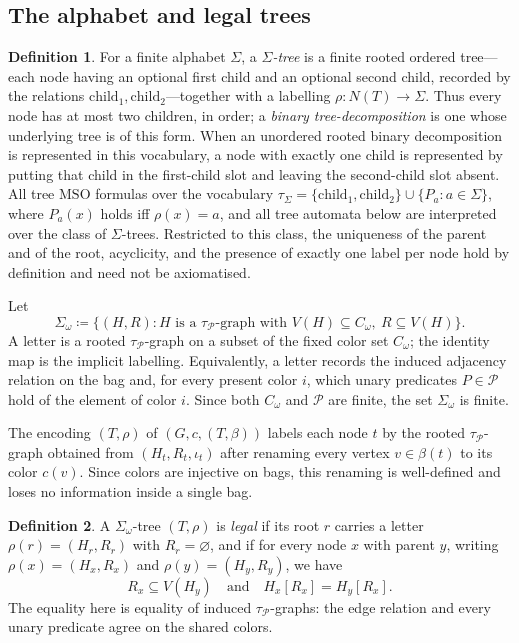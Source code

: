 \documentclass[11pt]{article}
\theoremstyle{definition}
\newtheorem{definition}{Definition}[section]
\newcommand{\MSO}{\ensuremath{\mathrm{MSO}}}
\newcommand{\defeq}{\coloneqq}
\newcommand{\child}{\mathrm{child}}
\newcommand{\Pred}{\mathcal P}
\begin{document}
\subsection{The alphabet and legal trees}

\begin{definition}\label{def:sigma-tree}
For a finite alphabet \(\Sigma\), a \emph{\(\Sigma\)-tree} is a finite rooted
ordered tree---each node having an optional first child and an optional second
child, recorded by the relations \(\child_1,\child_2\)---together with a labelling
\(\rho:N(T)\to\Sigma\).  Thus every node has at most two children, in order; a
\emph{binary tree-decomposition} is one whose underlying tree is of this form.
When an unordered rooted binary decomposition is represented in this vocabulary,
a node with exactly one child is represented by putting that child in the
first-child slot and leaving the second-child slot absent.
All tree \MSO{} formulas over the vocabulary
\(\tau_\Sigma=\{\child_1,\child_2\}\cup\{P_a:a\in\Sigma\}\), where \(P_a(x)\) holds
iff \(\rho(x)=a\), and all tree automata below are interpreted over the class of
\(\Sigma\)-trees.  Restricted to this class, the uniqueness of the parent and of
the root, acyclicity, and the presence of exactly one label per node hold by
definition and need not be axiomatised.
\end{definition}

Let
\[
  \Sigma_\omega \defeq
  \{(H,R): H \text{ is a } \tau_{\Pred}\text{-graph with }
       V(H)\subseteq C_\omega,\ R\subseteq V(H)\}.
\]
A letter is a rooted \(\tau_{\Pred}\)-graph on a subset of the fixed color set
\(C_\omega\); the identity map is the implicit labelling.  Equivalently, a
letter records the induced adjacency relation on the bag and, for every present
color \(i\), which unary predicates \(P\in\Pred\) hold of the element of color
\(i\).  Since both \(C_\omega\) and \(\Pred\) are finite, the set
\(\Sigma_\omega\) is finite.

The encoding \((T,\rho)\) of \((G,c,(T,\beta))\) labels each node \(t\) by the
rooted \(\tau_{\Pred}\)-graph obtained from \((H_t,R_t,\iota_t)\) after renaming
every vertex \(v\in\beta(t)\) to its color \(c(v)\).  Since colors are injective
on bags, this renaming is well-defined and loses no information inside a single
bag.

\begin{definition}
A \(\Sigma_\omega\)-tree \((T,\rho)\) is \emph{legal} if its root \(r\) carries a
letter \(\rho(r)=(H_r,R_r)\) with \(R_r=\varnothing\), and if for every node
\(x\) with parent \(y\), writing \(\rho(x)=(H_x,R_x)\) and \(\rho(y)=(H_y,R_y)\),
we have
\[
  R_x\subseteq V(H_y)
  \quad\text{and}\quad
  H_x[R_x]=H_y[R_x].
\]
The equality here is equality of induced \(\tau_{\Pred}\)-graphs: the edge
relation and every unary predicate agree on the shared colors.
\end{definition}
\end{document}
